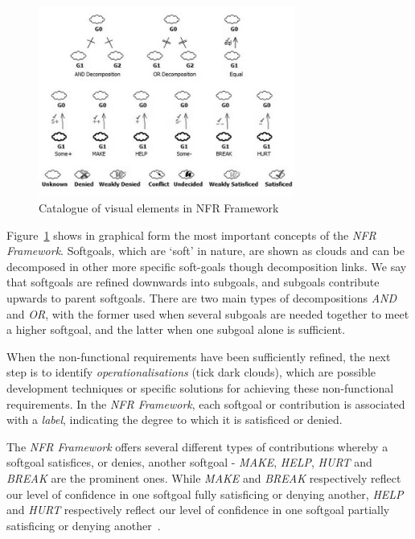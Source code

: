 \documentclass[dissertation,final]{softeng}
\begin{document}
{\begin{figure}[h]
\includegraphics[width=0.75\textwidth]{SIGLegend}
\centering
\caption[Catalogue of visual elements in NFR Framework]{Catalogue of visual elements in NFR Framework~\footnotemark}
\label{fig:sig_legend}
\end{figure}

Figure~\ref{fig:sig_legend} shows in graphical form the most important concepts of the \emph{NFR Framework}. Softgoals, which are `soft' in nature, are shown as clouds and can be decomposed in other more specific soft-goals though decomposition links. We say that softgoals are refined downwards into subgoals, and subgoals contribute upwards to parent softgoals. There are two main types of decompositions \emph{AND} and \emph{OR}, with the former used when several subgoals are needed together to meet a higher softgoal, and the latter when one subgoal alone is sufficient. 

When the non-functional requirements have been sufficiently refined, the next step is to identify \emph{operationalisations} (tick dark clouds), which are possible development techniques or specific solutions for achieving these non-functional requirements. In the \emph{NFR Framework}, each softgoal or contribution is associated with a \emph{label}, indicating the degree to which it is satisficed or denied.

The \emph{NFR Framework} offers several different types of contributions whereby a softgoal satisfices, or denies, another softgoal - \emph{MAKE}, \emph{HELP}, \emph{HURT} and \emph{BREAK} are the prominent ones. While \emph{MAKE} and \emph{BREAK} respectively reflect our level of confidence in one softgoal fully satisficing or denying another, \emph{HELP} and \emph{HURT} respectively reflect our level of confidence in one softgoal partially satisficing or denying another~\citep{Chung:2009vg}. 

}
\end{document}
